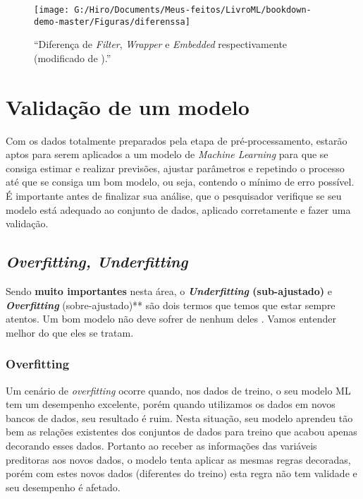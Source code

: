 \documentclass[
  openany]{book}
\begin{document}
\begin{figure}

{\centering \texttt{[image: G:/Hiro/Documents/Meus-feitos/LivroML/bookdown-demo-master/Figuras/diferenssa]} 

}

\caption{``Diferença de \emph{Filter}, \emph{Wrapper} e \emph{Embedded} respectivamente (modificado de \citet{covoes2010seleccao}).''}\label{fig:diferenssa}
\end{figure}



\hypertarget{valid}{%
\chapter{Validação de um modelo}\label{valid}}

Com os dados totalmente preparados pela etapa de pré-processamento, estarão aptos para serem aplicados a um modelo de \emph{Machine Learning} para que se consiga estimar e realizar previsões, ajustar parâmetros e repetindo o processo até que se consiga um bom modelo, ou seja, contendo o mínimo de erro possível. É importante antes de finalizar sua análise, que o pesquisador verifique se seu modelo está adequado ao conjunto de dados, aplicado corretamente e fazer uma validação.

\hypertarget{fitt}{%
\section{\texorpdfstring{\emph{Overfitting, Underfitting}}{Overfitting, Underfitting}}\label{fitt}}

Sendo \textbf{muito importantes} nesta área, o \textbf{\emph{Underfitting} (sub-ajustado)} e \textbf{\emph{Overfitting}} (sobre-ajustado)** são dois termos que temos que estar sempre atentos. Um bom modelo não deve sofrer de nenhum deles \citep{silver2013sinal}. Vamos entender melhor do que eles se tratam.

\hypertarget{overfitting}{%
\subsection{\texorpdfstring{\textbf{Overfitting}}{Overfitting}}\label{overfitting}}

Um cenário de \emph{overfitting} ocorre quando, nos dados de treino, o seu modelo ML tem um desempenho excelente, porém quando utilizamos os dados em novos bancos de dados, seu resultado é ruim. Nesta situação, seu modelo aprendeu tão bem as relações existentes dos conjuntos de dados para treino que acabou apenas decorando esses dados. Portanto ao receber as informações das variáveis preditoras aos novos dados, o modelo tenta aplicar as mesmas regras decoradas, porém com estes novos dados (diferentes do treino) esta regra não tem validade e seu desempenho é afetado.
\end{document}

